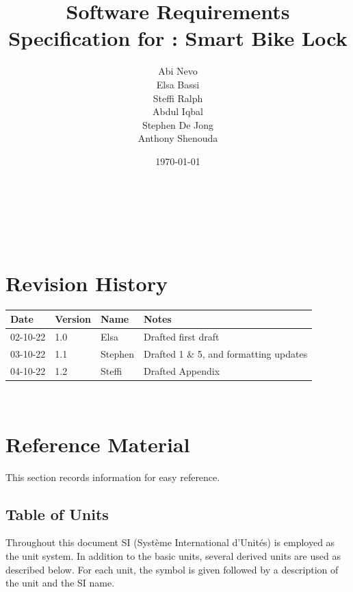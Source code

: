 \documentclass[12pt]{article}
\begin{document}
\title{Software Requirements Specification for \progname: Smart Bike Lock} 
\author{Abi Nevo\\Elsa Bassi\\Steffi Ralph\\Abdul Iqbal\\Stephen De Jong\\Anthony Shenouda}
\date{\today}
	
\maketitle

~\newpage


\tableofcontents

~\newpage

\section*{Revision History}

\begin{tabularx}{\textwidth}{p{2cm}p{2cm}p{2cm}X}
\toprule {\bf Date} & {\bf Version} & {\bf Name} & {\bf Notes}\\
\midrule
02-10-22 & 1.0 & Elsa & Drafted first draft\\
03-10-22& 1.1 & Stephen & Drafted 1 \& 5, and formatting updates\\
04-10-22& 1.2 & Steffi & Drafted Appendix\\
\bottomrule
\end{tabularx}

~\newpage

\section{Reference Material}

This section records information for easy reference.

\subsection{Table of Units}

Throughout this document SI (Syst\`{e}me International d'Unit\'{e}s) is employed
as the unit system.  In addition to the basic units, several derived units are
used as described below.  For each unit, the symbol is given followed by a
description of the unit and the SI name.
~\newline
\end{document}
